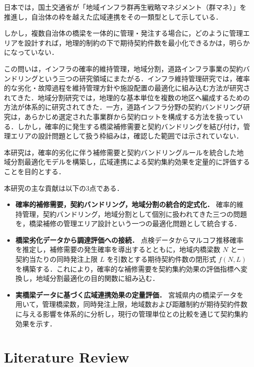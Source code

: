\documentclass[Journal,letterpaper,InsideFigs,NoLineNumbers]{ascelike-new}
\begin{document}
日本では，国土交通省が「地域インフラ群再生戦略マネジメント（群マネ）」を推進し，自治体の枠を越えた広域連携をその一類型として示している\cite{mlit2025gunmane}．

しかし，複数自治体の橋梁を一体的に管理・発注する場合に，どのように管理エリアを設計すれば，地理的制約の下で期待契約件数を最小化できるかは，明らかになっていない．

この問いは，インフラの確率的維持管理，地域分割，道路インフラ事業の契約バンドリングという三つの研究領域にまたがる．インフラ維持管理研究では，確率的な劣化・故障過程を維持管理方針や施設配置の最適化に組み込む方法が研究されてきた\cite{nakazato2023,mizutani2025}．地域分割研究では，地理的な基本単位を複数の地区へ編成するための方法が体系的に研究されてきた\cite{kalcsics2019}．一方，道路インフラ分野の契約バンドリング研究は，あらかじめ選定された事業群から契約ロットを構成する方法を扱っている\cite{qiao2026}．しかし，確率的に発生する橋梁補修需要と契約バンドリングを結び付け，管理エリアの設計問題として扱う枠組みは，確認した範囲では示されていない．

本研究は，確率的劣化に伴う補修需要と契約バンドリングルールを統合した地域分割最適化モデルを構築し，広域連携による契約集約効果を定量的に評価することを目的とする．

本研究の主な貢献は以下の3点である．

\begin{itemize}
\item \textbf{確率的補修需要，契約バンドリング，地域分割の統合的定式化．} 確率的維持管理，契約バンドリング，地域分割として個別に扱われてきた三つの問題を，橋梁補修の管理エリア設計という一つの最適化問題として統合する．
\item \textbf{橋梁劣化データから調達評価への接続．} 点検データからマルコフ推移確率を推定し，補修需要の発生確率を導出するとともに，地域内橋梁数 $N$ と一契約当たりの同時発注上限 $L$ を引数とする期待契約件数の閉形式 $f(N,L)$ を構築する．これにより，確率的な補修需要を契約集約効果の評価指標へ変換し，地域分割最適化の目的関数に組み込む．
\item \textbf{実橋梁データに基づく広域連携効果の定量評価．} 宮城県内の橋梁データを用いて，管理橋梁数，同時発注上限，地域数および距離制約が期待契約件数に与える影響を体系的に分析し，現行の管理単位との比較を通じて契約集約効果を示す．
\end{itemize}

\section{Literature Review}
\end{document}
